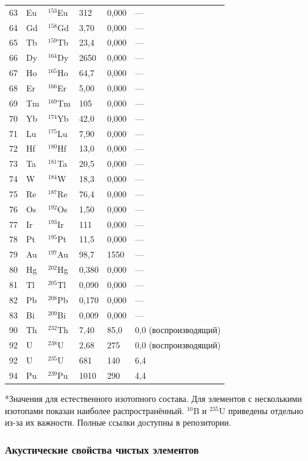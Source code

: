 \documentclass[12pt,a4paper]{article}
\begin{document}
\begin{longtable}{p{0.8cm}p{1.2cm}p{2.0cm}p{2.5cm}p{2.5cm}p{2.5cm}}
		63 & Eu & \(^{153}\)Eu & 312 & 0,000 & --- \\
		64 & Gd & \(^{158}\)Gd & 3,70 & 0,000 & --- \\
		65 & Tb & \(^{159}\)Tb & 23,4 & 0,000 & --- \\
		66 & Dy & \(^{164}\)Dy & 2650 & 0,000 & --- \\
		67 & Ho & \(^{165}\)Ho & 64,7 & 0,000 & --- \\
		68 & Er & \(^{166}\)Er & 5,00 & 0,000 & --- \\
		69 & Tm & \(^{169}\)Tm & 105 & 0,000 & --- \\
		70 & Yb & \(^{174}\)Yb & 42,0 & 0,000 & --- \\
		71 & Lu & \(^{175}\)Lu & 7,90 & 0,000 & --- \\
		72 & Hf & \(^{180}\)Hf & 13,0 & 0,000 & --- \\
		73 & Ta & \(^{181}\)Ta & 20,5 & 0,000 & --- \\
		74 & W  & \(^{184}\)W & 18,3 & 0,000 & --- \\
		75 & Re & \(^{187}\)Re & 76,4 & 0,000 & --- \\
		76 & Os & \(^{192}\)Os & 1,50 & 0,000 & --- \\
		77 & Ir & \(^{193}\)Ir & 111 & 0,000 & --- \\
		78 & Pt & \(^{195}\)Pt & 11,5 & 0,000 & --- \\
		79 & Au & \(^{197}\)Au & 98,7 & 1550 & --- \\
		80 & Hg & \(^{202}\)Hg & 0,380 & 0,000 & --- \\
		81 & Tl & \(^{205}\)Tl & 0,090 & 0,000 & --- \\
		82 & Pb & \(^{208}\)Pb & 0,170 & 0,000 & --- \\
		83 & Bi & \(^{209}\)Bi & 0,009 & 0,000 & --- \\
		90 & Th & \(^{232}\)Th & 7,40 & 85,0 & 0,0 (воспроизводящий) \\
		92 & U  & \(^{238}\)U & 2,68 & 275 & 0,0 (воспроизводящий) \\
		92 & U  & \(^{235}\)U & 681 & 140 & 6,4 \\
		94 & Pu & \(^{239}\)Pu & 1010 & 290 & 4,4 \\
		\bottomrule
	\end{longtable}
	*Значения для естественного изотопного состава. Для элементов с несколькими изотопами показан наиболее распространённый. \(^{10}\)B и \(^{235}\)U приведены отдельно из-за их важности. Полные ссылки доступны в репозитории.
	
	\subsubsection{Акустические свойства чистых элементов}
	\label{subsec:acoustic-properties-func}
	
\end{document}
